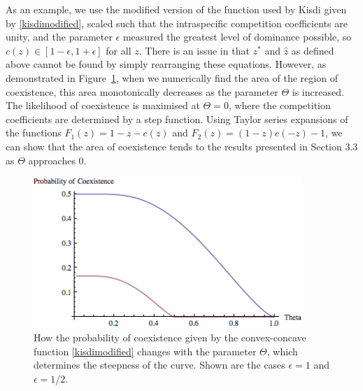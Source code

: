 As an example, we use the modified version of the function used by Kisdi \cite{kisdi1999evolutionary} given by \eqref{kisdimodified}, scaled such that the intraspecific competition coefficients are unity, and the parameter $\epsilon$ measured the greatest level of dominance possible, so $c(z) \in [1-\epsilon,1+\epsilon]$ for all $z$.  There is an issue in that $z^*$ and $\hat{z}$ as defined above cannot be found by simply rearranging these equations. However, as demonstrated in Figure~\ref{kisdipic}, when we numerically find the area of the region of coexistence, this area monotonically decreases as the parameter $\Theta$ is increased. The likelihood of coexistence is maximised at $\Theta=0$, where the competition coefficients are determined by a step function. Using Taylor series expansions of the functions $F_1(z)=1-z-c(z)$ and $F_2(z)=(1-z)c(-z)-1$, we can show that the area of coexistence tends to the results presented in Section 3.3 as $\Theta$ approaches 0.

\begin{figure}[htbp]
   \centering
   \includegraphics[width=4in]{kisdinum}
   \caption{How the probability of coexistence given by the convex-concave function \eqref{kisdimodified} changes with the parameter $\Theta$, which determines the steepness of the curve. Shown are the cases $\epsilon=1$ and $\epsilon=1/2$.}
   \label{kisdipic}
\end{figure}
 
